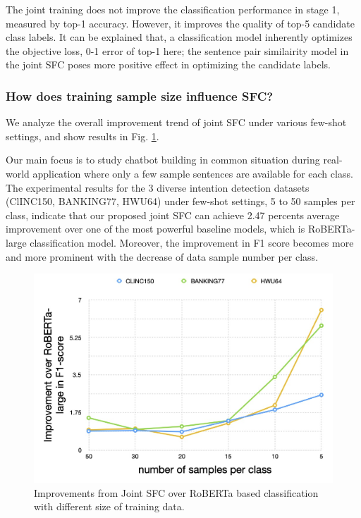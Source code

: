 The joint training does not improve the classification performance in stage 1,
measured  by  top-1  accuracy.  However,  it  improves  the  quality of top-5
candidate  class  labels.  It  can  be  explained that, a classification model
inherently optimizes the objective loss, 0-1 error of top-1 here; the sentence
pair similairity model in the joint SFC poses more positive effect in optimizing the 
candidate labels.


\subsubsection*{How does training sample size influence SFC?} 
We analyze the overall  improvement  trend  of  joint SFC under various few-shot
settings, and show results in Fig. \ref{fig:trend}.

Our main focus  is  to  study  chatbot  building  in common situation during real-world
application  where  only  a few sample sentences are available for each class.
The  experimental  results  for  the  3  diverse  intention detection datasets
(ClINC150,  BANKING77,  HWU64)  under  few-shot  settings, 5 to 50 samples per
class,  indicate that our proposed joint SFC can achieve 2.47 percents average
improvement   over  one  of  the  most  powerful  baseline  models,  which  is
RoBERTa-large  classification  model.  Moreover,  the  improvement  in F1 score
becomes  more  and  more prominent with the decrease of data sample number per
class.

\begin{figure}[t]
  \begin{centering}
    \includegraphics[scale=0.2]{picture/improvement_trend.jpg} 
    \par
  \end{centering}
  \caption{
    Improvements  from  Joint  SFC  over  RoBERTa  based  classification  with
    different size of training data.
  }
  \label{fig:trend}
\end{figure}

